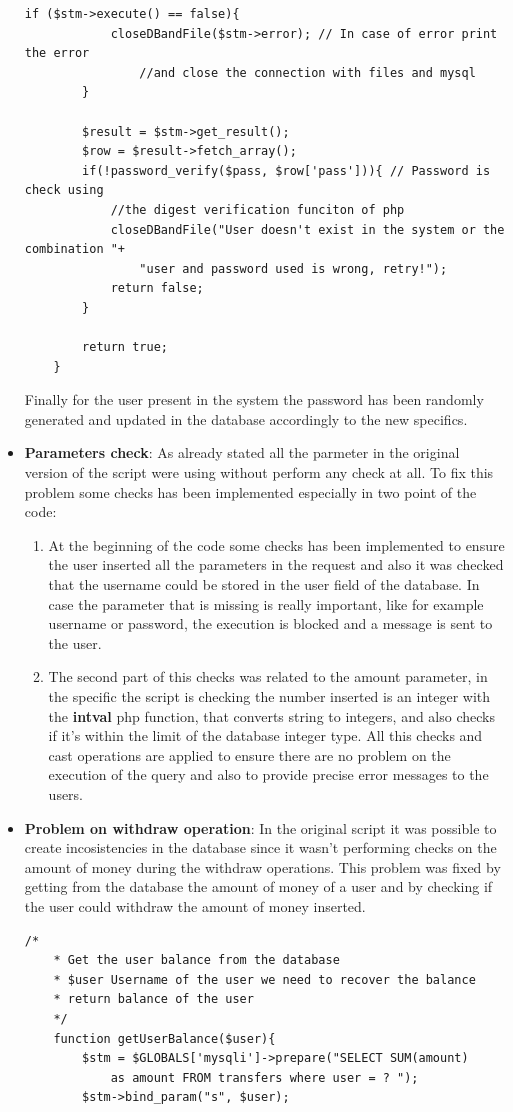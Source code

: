 \documentclass[14pt]{article}
\begin{document}
\begin{itemize}
\begin{Verbatim}[tabsize=4]
		if ($stm->execute() == false){
			closeDBandFile($stm->error); // In case of error print the error 
				//and close the connection with files and mysql 
		}
		
		$result = $stm->get_result();
		$row = $result->fetch_array();
		if(!password_verify($pass, $row['pass'])){ // Password is check using 
			//the digest verification funciton of php
			closeDBandFile("User doesn't exist in the system or the combination "+
				"user and password used is wrong, retry!");
			return false;
		}
		
		return true;
	}	
	\end{Verbatim}
	Finally for the user present in the system the password has been randomly generated and updated in the database accordingly to the new specifics.
	
	\item \textbf{Parameters check}: As already stated all the parmeter in the original version of the script were using without perform any check at all. To fix this problem some checks has been implemented especially in two point of the code:
	\begin{enumerate}
		\item At the beginning of the code some checks has been implemented to ensure the user inserted all the parameters in the request and also it was checked that the username could be stored in the user field of the database. In case the parameter that is missing is really important, like for example username or password, the execution is blocked and a message is sent to the user.
		
		\item The second part of this checks was related to the amount parameter, in the specific the script is checking the number inserted is an integer with the \textbf{intval} php function, that converts string to integers, and also checks if it's within the limit of the database integer type. All this checks and cast operations are applied to ensure there are no problem on the execution of the query and also to provide precise error messages to the users.
	\end{enumerate}

	\item \textbf{Problem on withdraw operation}: In the original script it was possible to create incosistencies in the database since it wasn't performing checks on the amount of money during the withdraw operations. This problem was fixed by getting from the database the amount of money of a user and by checking if the user could withdraw the amount of money inserted.
	\begin{Verbatim}[tabsize=4]
	/*
	* Get the user balance from the database
	* $user Username of the user we need to recover the balance
	* return balance of the user
	*/
	function getUserBalance($user){
		$stm = $GLOBALS['mysqli']->prepare("SELECT SUM(amount) 
			as amount FROM transfers where user = ? ");
		$stm->bind_param("s", $user);
		

\end{Verbatim}
\end{itemize}
\end{document}
